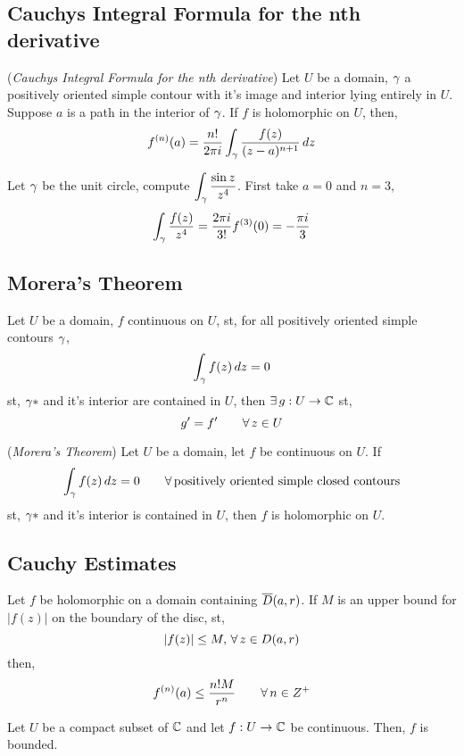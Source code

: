 \documentclass{article}
\begin{document}
\subsection{Cauchys Integral Formula for the nth derivative}
\begin{nthm}{(\textit{Cauchys Integral Formula for the nth derivative})}
  Let $U$ be a domain, $\gamma$ a positively oriented simple contour with it's image and interior lying entirely in $U$. Suppose $a$ is a path in the interior of $\gamma$. If $f$ is holomorphic on $U$, then,
  $$ f^{(n)}(a) = \frac{n!}{2\pi i}\int_\gamma \frac{f(z)}{(z - a)^{n+1}}\,dz $$
\end{nthm}

\begin{eg}
  Let $\gamma$ be the unit circle, compute $\displaystyle{\int_\gamma\frac{\sin z}{z^4}}$. First take $a=0$ and $n=3$,
  $$ \int_\gamma \frac{f(z)}{z^4} = \frac{2\pi i}{3!}f^{(3)}{(0)} = -\frac{\pi i}{3} $$
\end{eg}

\subsection{Morera's Theorem}
\begin{nthm}
  Let $U$ be a domain, $f$ continuous on $U$, st, for all positively oriented simple contours $\gamma$,
  $$ \int_\gamma f(z)\,dz = 0 $$
  st, $\gamma*$ and it's interior are contained in $U$, then $\exists\, g : U \to \mathbb{C}$ st,
  $$ g' = f' \qquad \forall\, z\in U$$
\end{nthm}

\begin{nthm}{(\textit{Morera's Theorem})}
  Let $U$ be a domain, let $f$ be continuous on $U$. If
  $$ \int_\gamma f(z)\,dz = 0 \qquad \forall\, \text{positively oriented simple closed contours} $$
  st, $\gamma*$ and it's interior is contained in $U$, then $f$ is holomorphic on $U$.
\end{nthm}

\subsection{Cauchy Estimates}
Let $f$ be holomorphic on a domain containing $\overline D(a, r)$. If $M$ is an upper bound for $|f(z)|$ on the boundary of the disc, st,
$$ |f(z)| \le M,\,\forall\, z\in D(a, r) $$
then,
$$ f^{(n)}(a) \le \frac{n! M}{r^n} \qquad\forall\, n \in Z^+ $$

\begin{nprop}
  Let $U$ be a compact subset of $\mathbb{C}$ and let $f : U \to \mathbb{C}$ be continuous. Then, $f$ is bounded.
\end{nprop}
\end{document}
